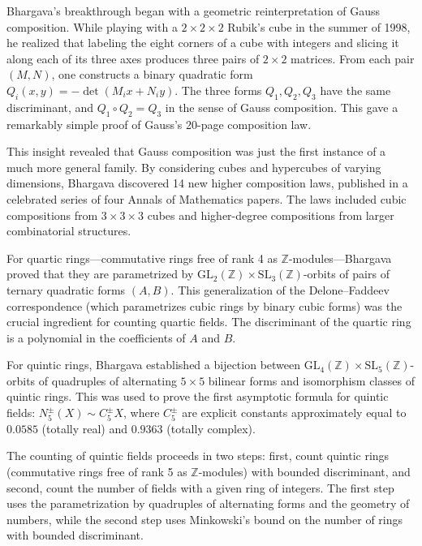 Bhargava's breakthrough began with a geometric reinterpretation of Gauss composition. While playing with a $2\times 2\times 2$ Rubik's cube in the summer of 1998, he realized that labeling the eight corners of a cube with integers and slicing it along each of its three axes produces three pairs of $2\times 2$ matrices. From each pair $(M,N)$, one constructs a binary quadratic form $Q_i(x,y) = -\det(M_ix + N_iy)$. The three forms $Q_1, Q_2, Q_3$ have the same discriminant, and $Q_1 \circ Q_2 = Q_3$ in the sense of Gauss composition. This gave a remarkably simple proof of Gauss's 20-page composition law.

This insight revealed that Gauss composition was just the first instance of a much more general family. By considering cubes and hypercubes of varying dimensions, Bhargava discovered 14 new higher composition laws, published in a celebrated series of four Annals of Mathematics papers. The laws included cubic compositions from $3\times 3\times 3$ cubes and higher-degree compositions from larger combinatorial structures.

For quartic rings---commutative rings free of rank 4 as $\mathbb{Z}$-modules---Bhargava proved that they are parametrized by $\mathrm{GL}_2(\mathbb{Z})\times\mathrm{SL}_3(\mathbb{Z})$-orbits of pairs of ternary quadratic forms $(A,B)$. This generalization of the Delone--Faddeev correspondence (which parametrizes cubic rings by binary cubic forms) was the crucial ingredient for counting quartic fields. The discriminant of the quartic ring is a polynomial in the coefficients of $A$ and $B$.

For quintic rings, Bhargava established a bijection between $\mathrm{GL}_4(\mathbb{Z})\times\mathrm{SL}_5(\mathbb{Z})$-orbits of quadruples of alternating $5\times 5$ bilinear forms and isomorphism classes of quintic rings. This was used to prove the first asymptotic formula for quintic fields: $N_5^{\pm}(X) \sim C_5^{\pm} X$, where $C_5^{\pm}$ are explicit constants approximately equal to $0.0585$ (totally real) and $0.9363$ (totally complex).

The counting of quintic fields proceeds in two steps: first, count quintic rings (commutative rings free of rank 5 as $\mathbb{Z}$-modules) with bounded discriminant, and second, count the number of fields with a given ring of integers. The first step uses the parametrization by quadruples of alternating forms and the geometry of numbers, while the second step uses Minkowski's bound on the number of rings with bounded discriminant.


